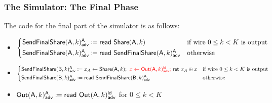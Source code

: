 \subsubsection{The Simulator: The Final Phase}
The code for the final part of the simulator is as follows:

\begin{itemize}
\item {\color{blue} $\begin{cases*} \LeakSendFinalShare(\A,k)^\A_\adv \coloneqq \read{\Share(\A,k)} & \text{if wire $0 \leq k < K$ is output} \\ \LeakSendFinalShare(\A,k)^\A_\adv \coloneqq \read{\LeakSendFinalShare(\A,k)^\A_\adv} & \text{otherwise} \end{cases*}$}
\item {\color{blue} $\begin{cases*} \LeakSendFinalShare(\B,k)^\A_\adv \coloneqq x_A \leftarrow \Share(\A,k); \ {\color{red} x \leftarrow \LeakOut(\A,k)^\id_\adv; \ } \ret{x_A \oplus x} & \text{if wire $0 \leq k < K$ is output} \\ \LeakSendFinalShare(\B,k)^\A_\adv \coloneqq \read{\LeakSendFinalShare(\B,k)^\A_\adv} & \text{otherwise} \end{cases*}$}
\item {\color{red} $\mathsf{Out}(\mathsf{A},k)^{\mathsf{A}}_{\mathsf{adv}} \coloneqq \mathsf{read} \ \mathsf{Out}(\mathsf{A},k)^{\mathsf{id}}_{\mathsf{adv}}$ for $0 \leq k < K$}
\end{itemize}